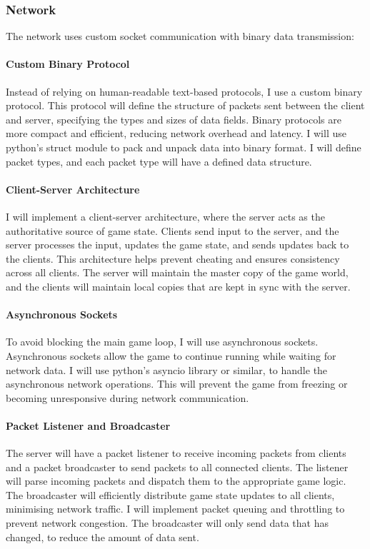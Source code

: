 \documentclass{article}
\begin{document}
\subsubsection{Network}

The network uses custom socket communication with binary data transmission:

\paragraph{Custom Binary Protocol}
Instead of relying on human-readable text-based protocols, I use a custom binary protocol. This protocol will define the structure of packets sent between the client and server, specifying the types and sizes of data fields. Binary protocols are more compact and efficient, reducing network overhead and latency. I will use python's struct module to pack and unpack data into binary format. I will define packet types, and each packet type will have a defined data structure.

\paragraph{Client-Server Architecture}
I will implement a client-server architecture, where the server acts as the authoritative source of game state. Clients send input to the server, and the server processes the input, updates the game state, and sends updates back to the clients. This architecture helps prevent cheating and ensures consistency across all clients. The server will maintain the master copy of the game world, and the clients will maintain local copies that are kept in sync with the server.

\paragraph{Asynchronous Sockets}
To avoid blocking the main game loop, I will use asynchronous sockets. Asynchronous sockets allow the game to continue running while waiting for network data. I will use python's asyncio library or similar, to handle the asynchronous network operations. This will prevent the game from freezing or becoming unresponsive during network communication.

\paragraph{Packet Listener and Broadcaster}
The server will have a packet listener to receive incoming packets from clients and a packet broadcaster to send packets to all connected clients. The listener will parse incoming packets and dispatch them to the appropriate game logic. The broadcaster will efficiently distribute game state updates to all clients, minimising network traffic. I will implement packet queuing and throttling to prevent network congestion. The broadcaster will only send data that has changed, to reduce the amount of data sent.
\end{document}
